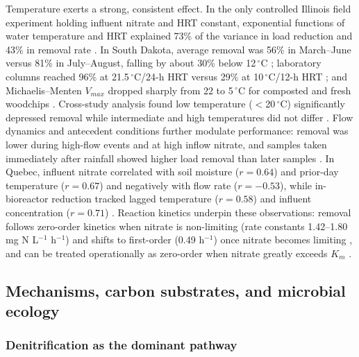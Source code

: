 Temperature exerts a strong, consistent effect. In the only controlled Illinois field experiment holding influent nitrate and HRT constant, exponential functions of water temperature and HRT explained 73\% of the variance in load reduction and 43\% in removal rate \parencite{Bell2015}. In South Dakota, average removal was 56\% in March--June versus 81\% in July--August, falling by about 30\% below 12\,$^{\circ}$C \parencite{Thapa2023}; laboratory columns reached 96\% at 21.5\,$^{\circ}$C/24-h HRT versus 29\% at 10\,$^{\circ}$C/12-h HRT \parencite{Soupir2018}; and Michaelis--Menten $V_{max}$ dropped sharply from 22 to 5\,$^{\circ}$C for composted and fresh woodchips \parencite{Kouanda2021}. Cross-study analysis found low temperature ($<$20\,$^{\circ}$C) significantly depressed removal while intermediate and high temperatures did not differ \parencite{Zhang2021b}. Flow dynamics and antecedent conditions further modulate performance: removal was lower during high-flow events and at high inflow nitrate, and samples taken immediately after rainfall showed higher load removal than later samples \parencite{Thapa2023}. In Quebec, influent nitrate correlated with soil moisture ($r=0.64$) and prior-day temperature ($r=0.67$) and negatively with flow rate ($r=-0.53$), while in-bioreactor reduction tracked lagged temperature ($r=0.58$) and influent concentration ($r=0.71$) \parencite{Husk2017}. Reaction kinetics underpin these observations: removal follows zero-order kinetics when nitrate is non-limiting (rate constants 1.42--1.80 mg N L$^{-1}$ h$^{-1}$) and shifts to first-order (0.49 h$^{-1}$) once nitrate becomes limiting \parencite{Hua2016}, and can be treated operationally as zero-order when nitrate greatly exceeds $K_m$ \parencite{Kouanda2021}.

\subsection{Mechanisms, carbon substrates, and microbial ecology}

\subsubsection{Denitrification as the dominant pathway}

